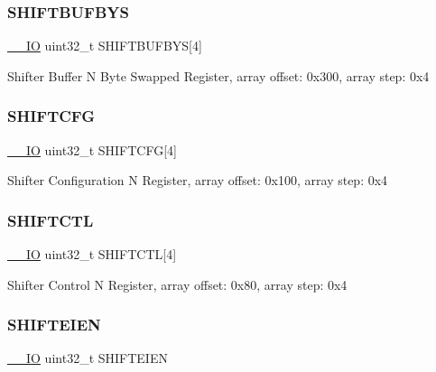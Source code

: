 \subsubsection{\texorpdfstring{SHIFTBUFBYS}{SHIFTBUFBYS}}
{\footnotesize\ttfamily \mbox{\hyperlink{core__cm0plus_8h_aec43007d9998a0a0e01faede4133d6be}{\+\_\+\+\_\+\+IO}} uint32\+\_\+t S\+H\+I\+F\+T\+B\+U\+F\+B\+YS\mbox{[}4\mbox{]}}

Shifter Buffer N Byte Swapped Register, array offset\+: 0x300, array step\+: 0x4 \mbox{\label{struct_f_l_e_x_i_o___type_aeced2688270619191cd5aebf195e01b0}} 
\subsubsection{\texorpdfstring{SHIFTCFG}{SHIFTCFG}}
{\footnotesize\ttfamily \mbox{\hyperlink{core__cm0plus_8h_aec43007d9998a0a0e01faede4133d6be}{\+\_\+\+\_\+\+IO}} uint32\+\_\+t S\+H\+I\+F\+T\+C\+FG\mbox{[}4\mbox{]}}

Shifter Configuration N Register, array offset\+: 0x100, array step\+: 0x4 \mbox{\label{struct_f_l_e_x_i_o___type_addbf4317298b1266f51b4336eec1796c}} 
\subsubsection{\texorpdfstring{SHIFTCTL}{SHIFTCTL}}
{\footnotesize\ttfamily \mbox{\hyperlink{core__cm0plus_8h_aec43007d9998a0a0e01faede4133d6be}{\+\_\+\+\_\+\+IO}} uint32\+\_\+t S\+H\+I\+F\+T\+C\+TL\mbox{[}4\mbox{]}}

Shifter Control N Register, array offset\+: 0x80, array step\+: 0x4 \mbox{\label{struct_f_l_e_x_i_o___type_a9571cdf93f6e2a618f6f0163003fe585}} 
\subsubsection{\texorpdfstring{SHIFTEIEN}{SHIFTEIEN}}
{\footnotesize\ttfamily \mbox{\hyperlink{core__cm0plus_8h_aec43007d9998a0a0e01faede4133d6be}{\+\_\+\+\_\+\+IO}} uint32\+\_\+t S\+H\+I\+F\+T\+E\+I\+EN}

